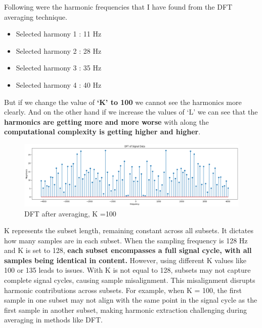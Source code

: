 \documentclass[11pt,a4paper]{article}
\begin{document}
Following were the harmonic frequencies that I have found from the DFT averaging technique.

\begin{itemize}
    \item Selected harmony 1 : 11 Hz
    \item Selected harmony 2 : 28 Hz
    \item Selected harmony 3 : 35 Hz
    \item Selected harmony 4 : 40 Hz
\end{itemize}


But if we change the value of \textbf{`K' to 100} we cannot see the harmonics more clearly.
And on the other hand if we increase the values of `L' we can see that the \textbf{harmonics are getting more and more worse} with along the \textbf{computational complexity is getting higher and higher}.\\

{\begin{figure}[h]
    \centering
    \includegraphics[width=1.0\linewidth]{images/3-2.png}
    \caption{DFT after averaging, K =100}
\end{figure}}

K represents the subset length, remaining constant across all subsets. It dictates how many samples are in each subset. When the sampling frequency is 128 Hz and K is set to 128, \textbf{each subset encompasses a full signal cycle, with all samples being identical in content.}
However, using different K values like 100 or 135 leads to issues. With K is not equal to 128, subsets may not capture complete signal cycles, causing sample misalignment. This misalignment disrupts harmonic contributions across subsets. For example, when K = 100, the first sample in one subset may not align with the same point in the signal cycle as the first sample in another subset, making harmonic extraction challenging during averaging in methods like DFT.
\end{document}
